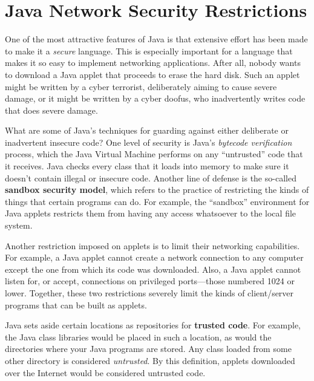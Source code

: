 \section{Java Network Security Restrictions}
\label{sec-security}\label{pg-sec-security}
\noindent One of the most attractive features of Java is that extensive effort
has been made to make it a {\it secure} language.  This is especially
important for a language that makes it so easy to implement networking
applications.   After all, nobody wants to download a Java applet that
proceeds to erase the hard disk.  Such an applet might be written
by a cyber terrorist, deliberately aiming to cause severe damage,
or it might be written by a cyber doofus, who inadvertently writes
code that does severe damage.

What are some of Java's techniques for guarding against either
deliberate or inadvertent insecure code?  One level of security is
Java's {\it bytecode verification} process, which the Java Virtual
Machine performs on any ``untrusted'' code that it receives.  Java
checks every class that it loads into memory to make sure it doesn't
contain illegal or insecure code.  Another line of defense is the
so-called {\bf sandbox security model}, which refers to the practice
of restricting the kinds of things that certain programs can do.  For
example, the ``sandbox'' environment for Java applets
restricts them from having any access whatsoever to the local file
system.

Another restriction imposed on applets is to limit their networking
capabilities.  For example, a Java applet cannot create a network
connection to any computer except the one from which its code was
downloaded.  Also, a Java applet cannot listen for, or accept,
connections on privileged ports---those numbered 1024 or
lower.  Together, these two restrictions severely limit the kinds of
client/server programs that can be built as applets.

Java sets aside certain locations as repositories for {\bf trusted
code}. For example, the Java class libraries would be placed in such a
location, as would the directories where your Java programs are
stored.  Any class loaded from some other directory is considered {\it
untrusted}. By this definition, applets downloaded over the Internet
would be considered untrusted code.


